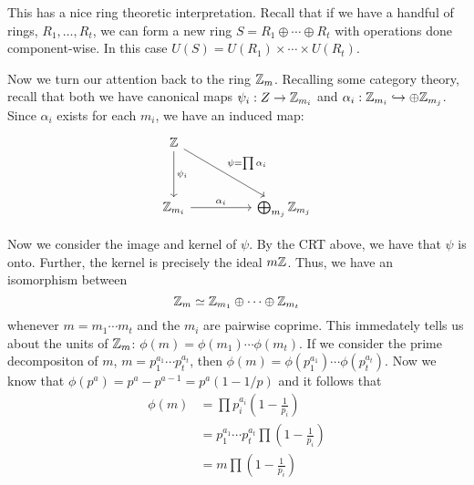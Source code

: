 This has a nice ring theoretic interpretation. Recall that if we have a handful
of rings, \(R_1, \dots , R_t\), we can form a new ring
\(S = R_1 \oplus \cdots \oplus R_t\) with operations done component-wise. In
this case \(U(S) = U(R_1) \times \cdots \times U(R_t)\).

Now we turn our attention back to the ring \(\mathbb{Z}_m\). Recalling some category
theory, recall that both we have canonical maps \(\psi_i: Z\to \mathbb{Z}_{m_i}\) and
\(\alpha_i: \mathbb{Z} _{m_i} \hookrightarrow \oplus \mathbb{Z}_{m_j}\). Since \(\alpha_i\)
exists for each \(m_i\), we have an induced map:
\[\begin{tikzcd}
	\ZZ \\
	\\
	{\ZZ_{m_i}} && {\bigoplus_{m_j} \ZZ_{m_j}}
	\arrow["{\psi_i}", from=1-1, to=3-1]
	\arrow["{\alpha_i}", from=3-1, to=3-3]
	\arrow["{\psi = \prod \alpha_i}", from=1-1, to=3-3]
\end{tikzcd}\]

Now we consider the image and kernel of \(\psi\). By the CRT above, we have that
\(\psi\) is onto. Further, the kernel is precisely the ideal \(m\mathbb{Z} \). Thus, we
have an isomorphism between
\[
  \mathbb{Z} _m \simeq \mathbb{Z}_{m_1} \oplus \cdots \oplus \mathbb{Z}_{m_t}
\]
whenever \(m=m_1\cdots m_t\) and the \(m_i\) are pairwise coprime. This
immedately tells us about the units of \(\mathbb{Z} _m\):
\(\phi(m)=\phi(m_1)\cdots\phi(m_t)\). If we consider the prime decompositon of
\(m\), \(m= p_1^{a_1}\cdots p_t^{a_t}\), then
\(\phi(m)= \phi(p_1^{a_1})\cdots \phi(p_t^{a_t})\). Now we know that
\(\phi(p^a)=p^a-p^{a-1}=p^a(1-1 / p)\) and it follows that
\begin{align*}
  \phi(m) &= \prod p_i^{a_i}\left(1-\frac{1}{p_i}\right) \\
          &= p_1^{a_1}\cdots p_t^{a_t} \prod\left(1-\frac{1}{p_i}\right) \\
          &= m \prod\left(1-\frac{1}{p_i}\right)
\end{align*}
